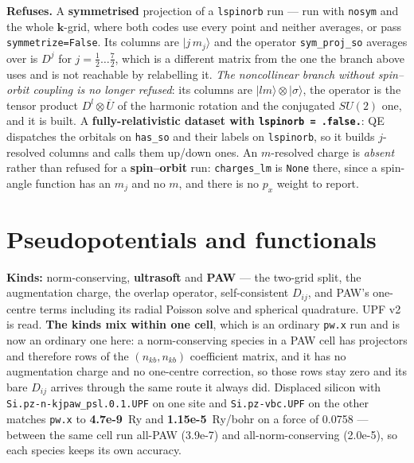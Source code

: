 \documentclass[11pt,a4paper]{article}
\newcommand{\code}[1]{\texttt{\small #1}}
\begin{document}
\begin{refuses}
\textbf{Refuses.} A \textbf{symmetrised} projection of a \code{lspinorb}
run --- run with \code{nosym} and the whole $\mathbf k$-grid, where both codes
use every point and neither averages, or pass \code{symmetrize=False}. Its
columns are $|j\, m_j\rangle$ and the operator \code{sym\_proj\_so} averages
over is $D^j$ for $j = \tfrac12 \ldots \tfrac72$, which is a different matrix
from the one the branch above uses and is not reachable by relabelling it.
\emph{The noncollinear branch without spin--orbit coupling is no longer
refused}: its columns are $|l m\rangle \otimes |\sigma\rangle$, the operator is
the tensor product $D^l \otimes \overline{U}$ of the harmonic rotation and the
conjugated $SU(2)$ one, and it is built. A \textbf{fully-relativistic dataset with
\code{lspinorb = .false.}}: QE dispatches the orbitals on \code{has\_so} and
their labels on \code{lspinorb}, so it builds $j$-resolved columns and calls
them up/down ones. An $m$-resolved charge is \emph{absent} rather than refused
for a \textbf{spin--orbit} run: \code{charges\_lm} is \code{None} there, since a
spin-angle function has an $m_j$ and no $m$, and there is no $p_x$ weight to
report.
\end{refuses}

\section{Pseudopotentials and functionals}

\textbf{Kinds:} norm-conserving, \textbf{ultrasoft} and \textbf{PAW} --- the
two-grid split, the augmentation charge, the overlap operator, self-consistent
$D_{ij}$, and PAW's one-centre terms including its radial Poisson solve and
spherical quadrature. UPF v2 is read. \textbf{The kinds mix within one cell},
which is an ordinary \code{pw.x} run and is now an ordinary one here: a
norm-conserving species in a PAW cell has projectors and therefore rows of the
$(n_{kb}, n_{kb})$ coefficient matrix, and it has no augmentation charge and no
one-centre correction, so those rows stay zero and its bare $D_{ij}$ arrives
through the same route it always did. Displaced silicon with
\code{Si.pz-n-kjpaw\_psl.0.1.UPF} on one site and \code{Si.pz-vbc.UPF} on the
other matches \code{pw.x} to \textbf{4.7e-9}~Ry and \textbf{1.15e-5}~Ry/bohr on
a force of 0.0758 --- between the same cell run all-PAW (3.9e-7) and
all-norm-conserving (2.0e-5), so each species keeps its own accuracy.
\end{document}
